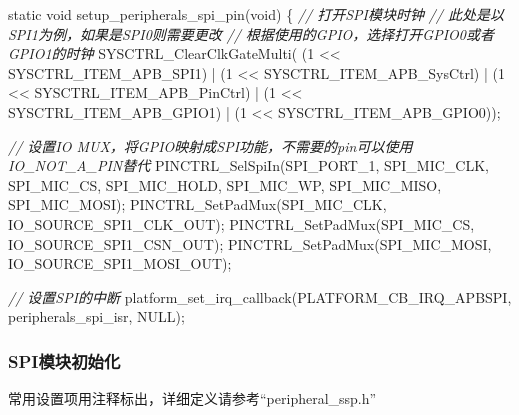 \documentclass[
  12pt,
]{book}
\newenvironment{Shaded}{\begin{snugshade}}{\end{snugshade}}
\newcommand{\CommentTok}[1]{\textcolor[rgb]{0.56,0.35,0.01}{\textit{#1}}}
\newcommand{\DataTypeTok}[1]{\textcolor[rgb]{0.13,0.29,0.53}{#1}}
\newcommand{\DecValTok}[1]{\textcolor[rgb]{0.00,0.00,0.81}{#1}}
\newcommand{\NormalTok}[1]{#1}
\begin{document}
\begin{Shaded}
\begin{Highlighting}[]
\DataTypeTok{static} \DataTypeTok{void}\NormalTok{ setup_peripherals_spi_pin(}\DataTypeTok{void}\NormalTok{)}
\NormalTok{\{}
    \CommentTok{// 打开SPI模块时钟}
    \CommentTok{// 此处是以SPI1为例，如果是SPI0则需要更改}
    \CommentTok{// 根据使用的GPIO，选择打开GPIO0或者GPIO1的时钟}
\NormalTok{    SYSCTRL_ClearClkGateMulti(    (}\DecValTok{1}\NormalTok{ << SYSCTRL_ITEM_APB_SPI1)}
\NormalTok{                                | (}\DecValTok{1}\NormalTok{ << SYSCTRL_ITEM_APB_SysCtrl)}
\NormalTok{                                | (}\DecValTok{1}\NormalTok{ << SYSCTRL_ITEM_APB_PinCtrl)}
\NormalTok{                                | (}\DecValTok{1}\NormalTok{ << SYSCTRL_ITEM_APB_GPIO1)}
\NormalTok{                                | (}\DecValTok{1}\NormalTok{ << SYSCTRL_ITEM_APB_GPIO0));}

    \CommentTok{// 设置IO MUX，将GPIO映射成SPI功能，不需要的pin可以使用IO_NOT_A_PIN替代}
\NormalTok{    PINCTRL_SelSpiIn(SPI_PORT_1, SPI_MIC_CLK, SPI_MIC_CS, SPI_MIC_HOLD, SPI_MIC_WP, SPI_MIC_MISO, SPI_MIC_MOSI);}
\NormalTok{    PINCTRL_SetPadMux(SPI_MIC_CLK, IO_SOURCE_SPI1_CLK_OUT);}
\NormalTok{    PINCTRL_SetPadMux(SPI_MIC_CS, IO_SOURCE_SPI1_CSN_OUT);}
\NormalTok{    PINCTRL_SetPadMux(SPI_MIC_MOSI, IO_SOURCE_SPI1_MOSI_OUT);}
    
    \CommentTok{// 设置SPI的中断}
\NormalTok{    platform_set_irq_callback(PLATFORM_CB_IRQ_APBSPI, peripherals_spi_isr, NULL);}
\end{Highlighting}
\end{Shaded}

\hypertarget{spiux6a21ux5757ux521dux59cbux5316}{%
\subsubsection{SPI模块初始化}\label{spiux6a21ux5757ux521dux59cbux5316}}

常用设置项用注释标出，详细定义请参考``peripheral\_ssp.h''
\end{document}
